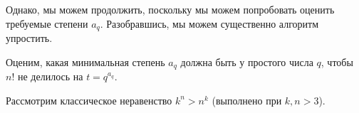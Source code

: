 \begin{itemize}
Однако, мы можем продолжить, поскольку мы можем попробовать оценить требуемые
степени $a_q$. Разобравшись, мы можем существенно алгоритм упростить.

Оценим, какая минимальная степень $a_q$ должна быть у простого числа $q$, чтобы 
$n!$ не делилось на $t=q^{a_q}$.






Рассмотрим классическое неравенство $k^n > n^k$ (выполнено при $k,n>3$).



%
%
%
%
%
%
%
%
%






%


\end{itemize}
